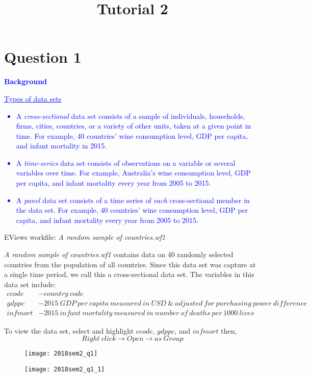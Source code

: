 \documentclass[12pt]{report}
\title{Tutorial 2}
\subtitle
{
	\textbf{keywords}: cross sectional data, time series data, histogram, summary statistics, scatter plot, confidence interval of population mean, logarithmic transformation, trends, seasonality
	
	\textbf{estimated reading time}: 34 minutes
}
\newenvironment{blueframed}[1][blue]
{\def\FrameCommand{\fboxsep=\FrameSep\fcolorbox{#1}{white}}%
\MakeFramed {\advance\hsize-\width \FrameRestore}}
{\endMakeFramed}
\begin{document}
	
\maketitle

\section*{Question 1}

\justify
\begin{blueframed}
	\textcolor{blue}{\textbf{Background}}
	\vspace{-\baselineskip}
	\justify
	\textcolor{blue}{\underline{Types of data sets} \begin{itemize}
			\item A \textit{cross-sectional} data set consists of a sample of individuals, households, firms, cities, countries, or a variety of other units, taken at a given point in time. For example, 40 countries' wine consumption level, GDP per capita, and infant mortality in 2015.
			\item A \textit{time-series} data set consists of observations on a variable or several variables over time. For example, Australia's wine consumption level, GDP per capita, and infant mortality every year from 2005 to 2015.
			\item A \textit{panel} data set consists of a time series of \textit{each} cross-sectional member in the data set. For example, 40 countries' wine consumption level, GDP per capita, and infant mortality every year from 2005 to 2015.
	\end{itemize}}
\end{blueframed}

\noindent EViews workfile: \textit{A random sample of countries.wf1}

\noindent \textit{A random sample of countries.wf1} contains data on 40 randomly selected countries from the population of all countries. Since this data set was capture at a single time period, we call this a cross-sectional data set. The variables in this data set include:
\begin{align*}
ccode &- country\ code \\
gdppc &- 2015\ GDP\ per\ capita\ measured\ in\ USD\ \&\ adjusted\ for\ purchasing\ power\ difference \\
infmort &- 2015\ infant\ mortality\ measured\ in\ number\ of\ deaths\ per\ 1000\ lives 
\end{align*}

\noindent To view the data set, select and highlight $ccode$, $gdppc$, and $infmort$ then,
$$Right\ click \to Open \to as\ Group$$
\begin{figure}[H]
	\centerline{\texttt{[image: 2018sem2\_q1]}}
\end{figure}
\begin{figure}[H]
	\centerline{\texttt{[image: 2018sem2\_q1\_1]}}
\end{figure}
\end{document}
